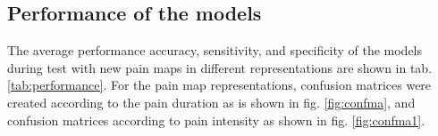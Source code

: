\subsection{Performance of the models}
The average performance accuracy, sensitivity, and specificity of the models during test with new pain maps in different representations are shown in tab. \ref{tab:performance}. \newline
For the pain map representations, confusion matrices were created according to the pain duration as is shown in fig. \ref{fig:confma}, and confusion matrices according to pain intensity as shown in fig. \ref{fig:confma1}.